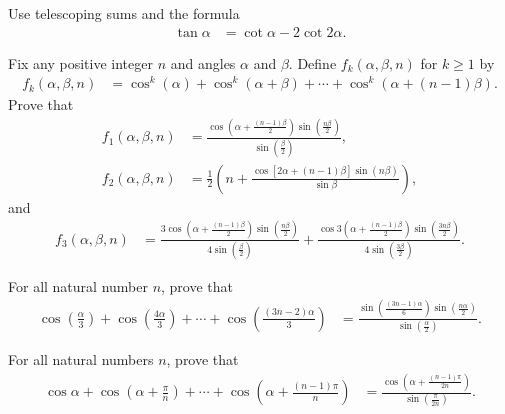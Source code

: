 \documentclass[12pt,a4paper]{memoir}
\theoremstyle{definition}
\begin{document}
\begin{solution}
	Use telescoping sums and the formula
	\begin{align*}
		\tan\alpha &= \cot \alpha - 2\cot 2\alpha.
	\end{align*}
\end{solution}



	\begin{question}
		Fix any positive integer $n$ and angles $\alpha$ and $\beta$. Define $f_k(\alpha,\beta, n)$ for $k\geq 1$ by
		\begin{align*}
			f_k(\alpha, \beta, n) &= \cos^k(\alpha) + \cos^k(\alpha+\beta) + \cdots + \cos^k(\alpha+(n-1)\beta).
		\end{align*}
		Prove that
		\begin{align*}
			f_1(\alpha, \beta, n) &= \frac{\displaystyle\cos\left(\alpha+\frac{(n-1)\beta}{2}\right)\sin\left(\frac{n\beta}{2}\right)}{\displaystyle\sin\left(\frac{\beta}{2}\right)},\\
			f_2(\alpha, \beta, n) &= \frac{1}{2}\left(n + \frac{\cos[2\alpha+(n-1)\beta]\sin(n\beta)}{\sin \beta}\right),
		\end{align*}
		and
		\begin{align*}
			f_3(\alpha, \beta, n) &= \frac{\displaystyle 3\cos\left(\alpha+\frac{(n-1)\beta}{2}\right)\sin\left(\frac{n\beta}{2}\right)}{\displaystyle 4\sin\left(\frac{\beta}{2}\right)}+\frac{\displaystyle \cos 3\left(\alpha+\frac{(n-1)\beta}{2}\right)\sin\left(\frac{3n\beta}{2}\right)}{\displaystyle 4\sin\left(\frac{3\beta}{2}\right)}.
		\end{align*}
	\end{question}




\begin{question}
	For all natural number $n$, prove that
	\begin{align*}
		\cos\left(\frac{\alpha}{3}\right) + \cos\left(\frac{4\alpha}{3}\right)  + \cdots + \cos\left(\frac{(3n-2)\alpha}{3}\right) &= \frac{\displaystyle\sin\left(\frac{(3n-1)\alpha}{6}\right)\sin\left(\frac{n\alpha}{2}\right)}{\displaystyle\sin\left(\frac{\alpha}{2}\right)}.
	\end{align*}
\end{question}


\begin{question}
	For all natural numbers $n$, prove that
	\begin{align*}
		\cos \alpha + \cos\left(\alpha+\frac{\pi}{n}\right)   + \cdots + \cos\left(\alpha+\frac{(n-1)\pi}{n}\right) &=      \frac{\displaystyle\cos\left(\alpha+\frac{(n-1)\pi}{2n}\right)}{\displaystyle\sin\left(\frac{\pi}{2n}\right)}.
	\end{align*}
\end{question}
\end{document}

